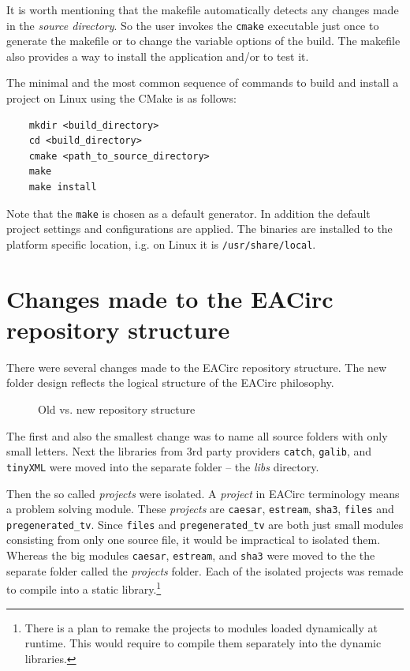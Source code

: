 \documentclass[12pt,oneside]{fithesis2}
\begin{document}
It is worth mentioning that the makefile automatically detects any changes made in the \emph{source directory}. So the user invokes the \texttt{cmake} executable just once to generate the makefile or to change the variable options of the build. The makefile also provides a way to install the application and/or to test it.

The minimal and the most common sequence of commands to build and install a project on Linux using the CMake is as follows:
	\begin{verbatim}
	mkdir <build_directory>
	cd <build_directory>
	cmake <path_to_source_directory>
	make
	make install
	\end{verbatim}
Note that the \texttt{make} is chosen as a default generator. In addition the default project settings and configurations are applied. The binaries are installed to the platform specific location, i.g. on Linux it is \texttt{/usr/share/local}.

\section{Changes made to the EACirc repository structure}

There were several changes made to the EACirc repository structure. The new folder design reflects the logical structure of the EACirc philosophy.

	\begin{figure}[H]
	\centering
	
	\caption{Old vs. new repository structure}
	\end{figure}
	
\noindent
The first and also the smallest change was to name all source folders with only small letters. Next the libraries from 3rd party providers \texttt{catch}, \texttt{galib}, and \texttt{tinyXML} were moved into the separate folder -- the \emph{libs} directory.

Then the so called \emph{projects} were isolated. A \emph{project} in EACirc terminology means a problem solving module. These \emph{projects} are \texttt{caesar}, \texttt{estream}, \texttt{sha3}, \texttt{files} and \texttt{pregenerated\_tv}. Since \texttt{files} and \texttt{pregenerated\_tv} are both just small modules consisting from only one source file, it would be impractical to isolated them. Whereas the big modules \texttt{caesar}, \texttt{estream}, and \texttt{sha3} were moved to the the separate folder called the \emph{projects} folder. Each of the isolated projects was remade to compile into a static library.\footnote{There is a plan to remake the projects to modules loaded dynamically at runtime. This would require to compile them separately into the dynamic libraries.}
\end{document}
